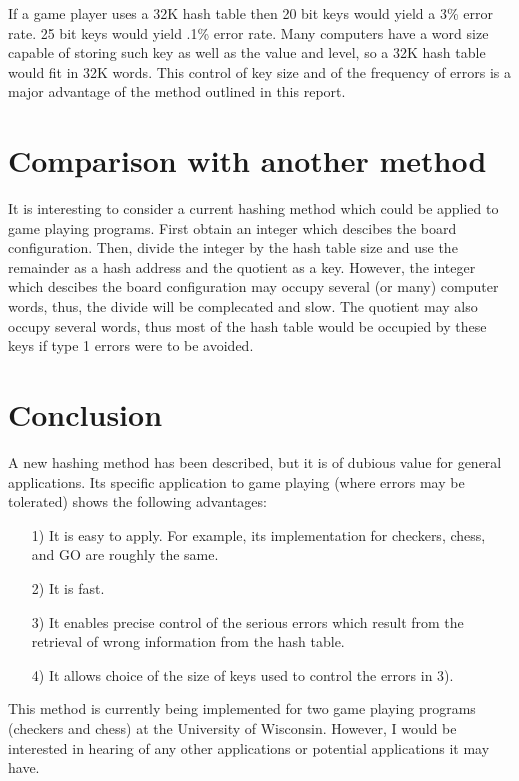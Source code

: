 \documentclass{article}
\begin{document}
If a game player uses a 32K hash table then 20 bit keys would yield a 3\% error
rate. 25 bit keys would yield .1\% error rate. Many computers have a word size
capable of storing such key as well as the value and level, so a 32K hash table
would fit in 32K words. This control of key size and of the frequency of errors
is a major advantage of the method outlined in this report.

\section*{Comparison with another method}

It is interesting to consider a current hashing method which could be applied
to game playing programs. First obtain an integer which descibes the board
configuration. Then, divide the integer by the hash table size and use the
remainder as a hash address and the quotient as a key. However, the integer
which descibes the board configuration may occupy several (or many) computer
words, thus, the divide will be complecated and slow. The quotient may also
occupy several words, thus most of the hash table would be occupied by these
keys if type 1 errors were to be avoided.

\section*{Conclusion}

A new hashing method has been described, but it is of dubious value for general
applications. Its specific application to game playing (where errors may be
tolerated) shows the following advantages:

\begin{itemize}
\item[1)] It is easy to apply. For example, its implementation for checkers,
chess, and GO are roughly the same.
\item[2)] It is fast.
\item[3)] It enables precise control of the serious errors which result from
the retrieval of wrong information from the hash table.
\item[4)] It allows choice of the size of keys used to control the errors in 3).
\end{itemize}

This method is currently being implemented for two game playing programs
(checkers and chess) at the University of Wisconsin. However, I would be
interested in hearing of any other applications or potential applications it
may have.
\end{document}
